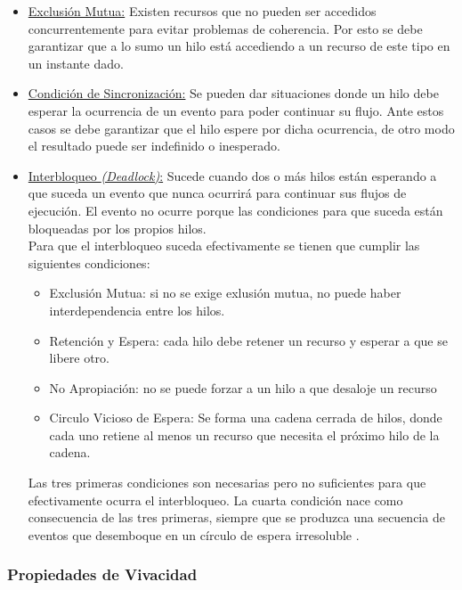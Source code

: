 \begin{itemize}
    \item \underline{Exclusión Mutua:} Existen recursos que no pueden ser
    accedidos concurrentemente para evitar problemas de coherencia. Por esto se
    debe garantizar que a lo sumo un hilo está accediendo a un recurso de este
    tipo en un instante dado.
    \item \underline{Condición de Sincronización:} Se pueden dar situaciones
    donde un hilo debe esperar la ocurrencia de un evento para poder
    continuar su flujo. Ante estos casos se debe garantizar que el hilo
    espere por dicha ocurrencia, de otro modo el resultado puede ser indefinido
    o inesperado.
    \item \underline{Interbloqueo \textit{(Deadlock)}:} Sucede cuando dos o más
    hilos están esperando a que suceda un evento que nunca ocurrirá para
    continuar sus flujos de ejecución. El evento no ocurre porque las
    condiciones para que suceda están bloqueadas por los propios hilos.\\
    Para que el interbloqueo suceda efectivamente se tienen que cumplir las
    siguientes condiciones:
    \begin{itemize} 
        \item Exclusión Mutua: si no se exige exlusión mutua, no puede haber
        interdependencia entre los hilos.
        \item Retención y Espera: cada hilo debe retener un recurso y esperar
        a que se libere otro.
        \item No Apropiación: no se puede forzar a un hilo a que desaloje un
        recurso
        \item Circulo Vicioso de Espera: Se forma una cadena cerrada de
        hilos, donde cada uno retiene al menos un recurso que necesita el
        próximo hilo de la cadena.
    \end{itemize}
    Las tres primeras condiciones son necesarias pero no suficientes para que
    efectivamente ocurra el interbloqueo. La cuarta condición nace como
    consecuencia de las tres primeras, siempre que se produzca una secuencia de
    eventos que desemboque en un círculo de espera irresoluble
    \cite{SistOpStallings}.
\end{itemize}

\subsubsection*{Propiedades de Vivacidad}

